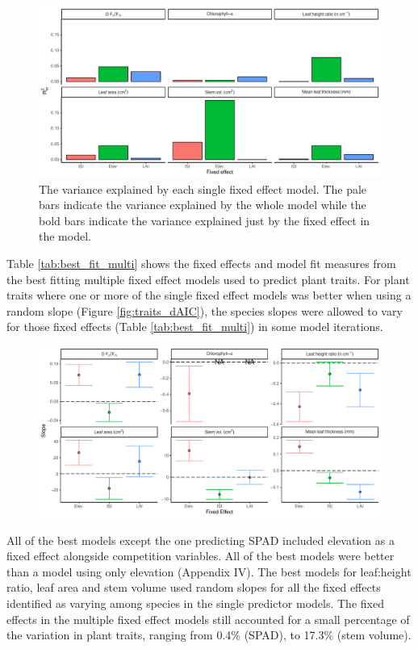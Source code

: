 \documentclass[a4paper, 11pt]{article}
\begin{document}
\begin{figure}[H]
\includegraphics[width=\textwidth]{single_pred_r2m}
\centering
\caption{The variance explained by each single fixed effect model. The pale bars indicate the variance explained by the whole model while the bold bars indicate the variance explained just by the fixed effect in the model.}
\label{fig:single_pred_r2m}
\end{figure}

Table \ref{tab:best_fit_multi} shows the fixed effects and model fit measures from the best fitting multiple fixed effect models used to predict plant traits. For plant traits where one or more of the single fixed effect models was better when using a random slope (Figure \ref{fig:traits_dAIC}), the species slopes were allowed to vary for those fixed effects (Table \ref{tab:best_fit_multi}) in some model iterations. 

\begin{figure}[H]
\includegraphics[width=\textwidth]{multi_pred_slope}
\centering
\caption{}
\label{fig:multi_pred_slope}
\end{figure}

All of the best models except the one predicting SPAD included elevation as a fixed effect alongside competition variables. All of the best models were better than a model using only elevation (Appendix IV). The best models for leaf:height ratio, leaf area and stem volume used random slopes for all the fixed effects identified as varying among species in the single predictor models. The fixed effects in the multiple fixed effect models still accounted for a small percentage of the variation in plant traits, ranging from 0.4\% (SPAD), to 17.3\% (stem volume).
\end{document}
